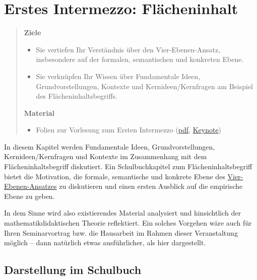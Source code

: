 \documentclass[
]{scrbook}
\providecommand{\tightlist}{%
  \setlength{\itemsep}{0pt}\setlength{\parskip}{0pt}}
\theoremstyle{definition}
\theoremstyle{definition}
\theoremstyle{definition}
\theoremstyle{definition}
\theoremstyle{remark}
\begin{document}
\hypertarget{erstes-intermezzo-flaecheninhalt}{%
\chapter{Erstes Intermezzo: Flächeninhalt}\label{erstes-intermezzo-flaecheninhalt}}

\begin{quote}
\textbf{Ziele}

\begin{itemize}
\tightlist
\item
  Sie vertiefen Ihr Verständnis über den Vier-Ebenen-Ansatz, insbesondere auf der formalen, semantischen und konkreten Ebene.
\item
  Sie verknüpfen Ihr Wissen über Fundamentale Ideen, Grundvorstellungen, Kontexte und Kernideen/Kernfragen am Beispiel des Flächeninhaltsbegriffs.
\end{itemize}

\textbf{Material}

\begin{itemize}
\tightlist
\item
  Folien zur Vorlesung zum Ersten Intermezzo (\href{files/Stoffdidaktik-WiSe2223-Kap5.pdf}{pdf}, \href{files/Stoffdidaktik-WiSe2223-Kap5.key}{Keynote})
\end{itemize}
\end{quote}

In diesem Kapitel werden Fundamentale Ideen, Grundvorstellungen, Kernideen/Kernfragen und Kontexte im Zusammenhang mit dem Flächeninhaltsbegriff diskutiert. Ein Schulbuchkapitel zum Flächeninhaltsbegriff bietet die Motivation, die \textcolor{formalColor}{formale}, \textcolor{semanticColor}{semantische} und \textcolor{concreteColor}{konkrete} Ebene des \protect\hyperlink{tab:fragen-ebenen}{Vier-Ebenen-Ansatzes} zu diskutieren und einen ersten Ausblick auf die \textcolor{empiricColor}{empirische} Ebene zu geben.

In dem Sinne wird also existierendes Material analysiert und hinsichtlich der mathematikdidaktischen Theorie reflektiert. Ein solches Vorgehen wäre auch für Ihren Seminarvortrag bzw. die Hausarbeit im Rahmen dieser Veranstaltung möglich -- dann natürlich etwas ausführlicher, als hier dargestellt.

\hypertarget{darstellung-im-schulbuch}{%
\section{Darstellung im Schulbuch}\label{darstellung-im-schulbuch}}
\end{document}
